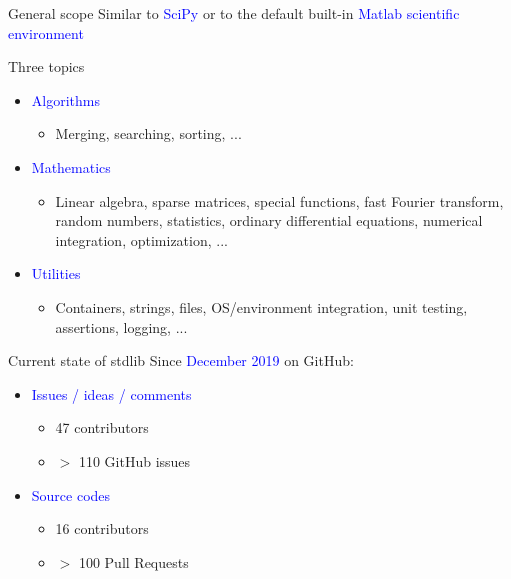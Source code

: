 \documentclass{beamer}
\begin{document}
\begin{frame}[t]{General scope}
	Similar to \textcolor{blue}{SciPy} or
	to the default built-in \textcolor{blue}{Matlab scientific environment}

        \textcolor{mygreen}{Three} topics
	\begin{itemize}
		\item \textcolor{blue}{Algorithms}
		\begin{itemize}
			\item Merging, searching, sorting, ...
		\end{itemize}
		\item \textcolor{blue}{Mathematics}
		\begin{itemize}
			\item Linear algebra, sparse matrices, special functions, fast Fourier transform, random numbers, statistics, ordinary differential equations, numerical integration, optimization, ...
		\end{itemize}
		\item \textcolor{blue}{Utilities}
		\begin{itemize}
			\item Containers, strings, files, OS/environment integration, unit testing, assertions, logging, ...
		\end{itemize}
	\end{itemize}
\end{frame}


\begin{frame}[c]{Current state of stdlib}
	Since \textcolor{blue}{December 2019} on GitHub:
	\begin{itemize}
		\item \textcolor{blue}{Issues / ideas / comments}
		\begin{itemize}
			\item 47 contributors
			\item $>$ 110 GitHub issues
		\end{itemize}	
		\item \textcolor{blue}{Source codes}
		\begin{itemize}
			\item 16 contributors
			\item $>$ 100 Pull Requests
		\end{itemize}
	\end{itemize}
\end{frame}
\end{document}
